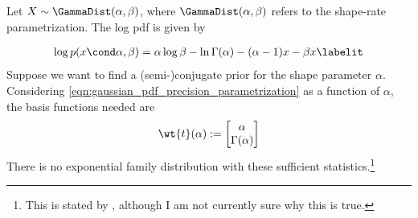 \begin{example} 
Let $X \sim \GammaDist(\alpha, \beta)$, where $\GammaDist(\alpha, \beta)$ refers to the shape-rate parametrization.  The log pdf is given by

\begin{align*}
 \log p(x \cond \alpha, \beta) = \alpha \log \beta - \ln \Gamma(\alpha) - (\alpha -1 ) x - \beta x 
 \labelit \label{eqn:gamma_pdf}
\end{align*}  
Suppose we want to find a (semi-)conjugate prior for the shape parameter $\alpha$.  Considering \eqref{eqn:gaussian_pdf_precision_parametrization} as a function of $\alpha$, the basis functions needed are
\[ \wt{t}(\alpha) := 
\begin{bmatrix} 
\alpha \\
\Gamma(\alpha) 
\end{bmatrix} 
  \]
There is no exponential family distribution with these sufficient statistics.\footnote{This is stated by \cite{winn2005variational}, although I am not currently sure why this is true.} 
\end{example}
